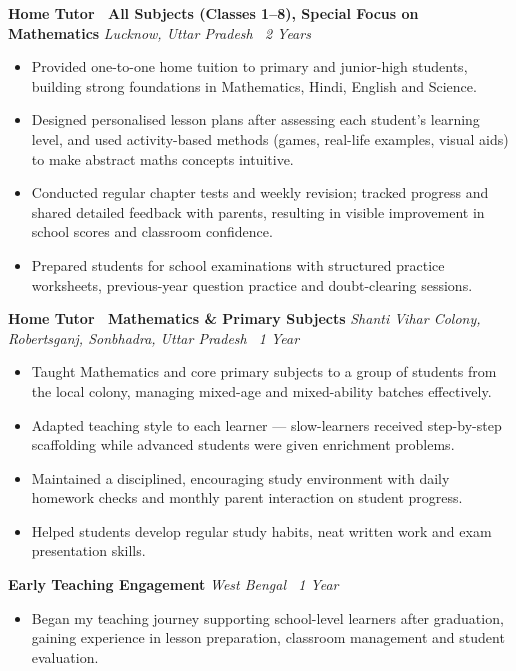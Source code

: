 \documentclass[10pt,a4paper]{article}
\newcommand{\cvevent}[2]{%
  \textbf{\color{primary}#1} \hfill \textit{\color{lightgray}#2}\par}
\begin{document}
\cvevent{Home Tutor \textemdash\ All Subjects (Classes 1--8), Special Focus on Mathematics}{Lucknow, Uttar Pradesh \textemdash\ 2 Years}
\begin{itemize}[leftmargin=1.1em, itemsep=0pt, topsep=1pt, parsep=0pt]
  \item Provided one-to-one home tuition to primary and junior-high students, building
        strong foundations in Mathematics, Hindi, English and Science.
  \item Designed personalised lesson plans after assessing each student's learning level,
        and used activity-based methods (games, real-life examples, visual aids) to make
        abstract maths concepts intuitive.
  \item Conducted regular chapter tests and weekly revision; tracked progress and shared
        detailed feedback with parents, resulting in visible improvement in school scores
        and classroom confidence.
  \item Prepared students for school examinations with structured practice worksheets,
        previous-year question practice and doubt-clearing sessions.
\end{itemize}

\cvevent{Home Tutor \textemdash\ Mathematics \& Primary Subjects}{Shanti Vihar Colony, Robertsganj, Sonbhadra, Uttar Pradesh \textemdash\ 1 Year}
\begin{itemize}[leftmargin=1.1em, itemsep=0pt, topsep=1pt, parsep=0pt]
  \item Taught Mathematics and core primary subjects to a group of students from the local
        colony, managing mixed-age and mixed-ability batches effectively.
  \item Adapted teaching style to each learner --- slow-learners received step-by-step
        scaffolding while advanced students were given enrichment problems.
  \item Maintained a disciplined, encouraging study environment with daily homework
        checks and monthly parent interaction on student progress.
  \item Helped students develop regular study habits, neat written work and exam
        presentation skills.
\end{itemize}

\cvevent{Early Teaching Engagement}{West Bengal \textemdash\ 1 Year}
\begin{itemize}[leftmargin=1.1em, itemsep=0pt, topsep=1pt, parsep=0pt]
  \item Began my teaching journey supporting school-level learners after graduation,
        gaining experience in lesson preparation, classroom management and student
        evaluation.
\end{itemize}
\end{document}

